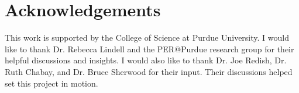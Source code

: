 \chapter[Acknowledgements]{Acknowledgements}

This work is supported by the College of Science at Purdue University. I would like to thank Dr. Rebecca Lindell and the PER@Purdue research group for their helpful discussions and insights. I would also like to thank Dr. Joe Redish, Dr. Ruth Chabay, and Dr. Bruce Sherwood for their input. Their discussions helped set this project in motion.